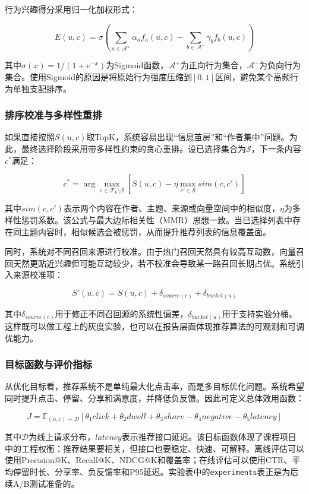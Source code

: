 行为兴趣得分采用归一化加权形式：

\[
  E(u,c)=\sigma\left(\sum_{a \in \mathcal{A}^{+}}\alpha_a f_a(u,c)-\sum_{b \in \mathcal{A}^{-}}\gamma_b f_b(u,c)\right)
\]

其中$\sigma(x)=1/(1+e^{-x})$为Sigmoid函数，$\mathcal{A}^{+}$为正向行为集合，$\mathcal{A}^{-}$为负向行为集合。使用Sigmoid的原因是将原始行为强度压缩到$[0,1]$区间，避免某个高频行为单独支配排序。

\subsubsection{排序校准与多样性重排}

如果直接按照$S(u,c)$取TopK，系统容易出现“信息茧房”和“作者集中”问题。为此，最终选择阶段采用带多样性约束的贪心重排。设已选择集合为$\mathcal{S}$，下一条内容$c^\ast$满足：

\[
  c^\ast=\arg\max_{c \in \mathcal{F}_u \setminus \mathcal{S}}
  \left[S(u,c)-\eta \max_{c' \in \mathcal{S}} sim(c,c')\right]
\]

其中$sim(c,c')$表示两个内容在作者、主题、来源或向量空间中的相似度，$\eta$为多样性惩罚系数。该公式与最大边际相关性（MMR）思想一致\cite{carbonell1998mmr}。当已选择列表中存在同主题内容时，相似候选会被惩罚，从而提升推荐列表的信息覆盖面。

同时，系统对不同召回来源进行校准。由于热门召回天然具有较高互动数，向量召回天然更贴近兴趣但可能互动较少，若不校准会导致某一路召回长期占优。系统引入来源校准项：

\[
  S'(u,c)=S(u,c)+\delta_{source(c)}+\delta_{bucket(u)}
\]

其中$\delta_{source(c)}$用于修正不同召回源的系统性偏差，$\delta_{bucket(u)}$用于支持实验分桶。这样既可以做工程上的灰度实验，也可以在报告层面体现推荐算法的可观测和可调优能力。

\subsubsection{目标函数与评价指标}

从优化目标看，推荐系统不是单纯最大化点击率，而是多目标优化问题。系统希望同时提升点击、停留、分享和满意度，并降低负反馈。因此可定义总体效用函数：

\[
  J=\mathbb{E}_{(u,c)\sim \mathcal{D}}
  \left[\theta_1 click+\theta_2 dwell+\theta_3 share-\theta_4 negative-\theta_5 latency\right]
\]

其中$\mathcal{D}$为线上请求分布，$latency$表示推荐接口延迟。该目标函数体现了课程项目中的工程权衡：推荐结果要相关，但接口也要稳定、快速、可解释。离线评估可以使用Precision@K、Recall@K、NDCG@K和覆盖率；在线评估可以使用CTR、平均停留时长、分享率、负反馈率和P95延迟。实验表中的\texttt{experiments}表正是为后续A/B测试准备的。

